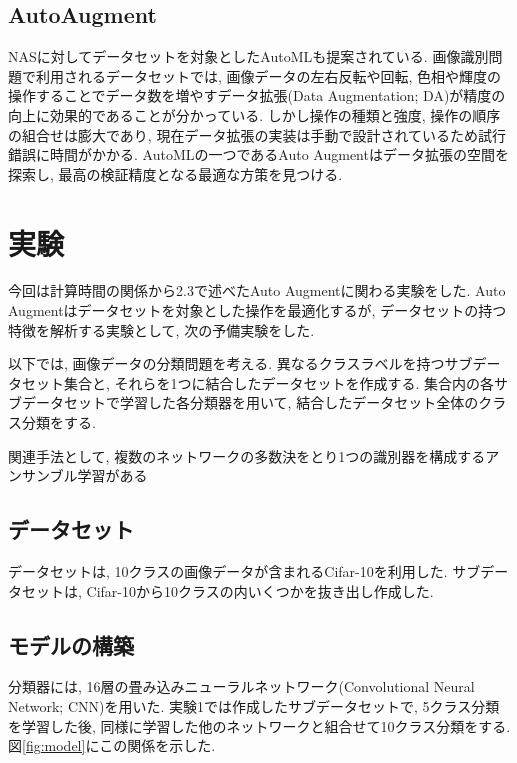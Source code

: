 \documentclass[twocolumn]{jarticle}     %
\begin{document}
\subsection{AutoAugment}

NASに対してデータセットを対象としたAutoMLも提案されている.
画像識別問題で利用されるデータセットでは, 画像データの左右反転や回転, 色相や輝度の操作することでデータ数を増やすデータ拡張(Data Augmentation; DA)が精度の向上に効果的であることが分かっている.
しかし操作の種類と強度, 操作の順序の組合せは膨大であり, 現在データ拡張の実装は手動で設計されているため試行錯誤に時間がかかる.
AutoMLの一つであるAuto Augment\cite{DBLP:journals/corr/abs-1805-09501}はデータ拡張の空間を探索し, 最高の検証精度となる最適な方策を見つける.

\section{実験}
今回は計算時間の関係から2.3で述べたAuto Augmentに関わる実験をした.
Auto Augmentはデータセットを対象とした操作を最適化するが,
データセットの持つ特徴を解析する実験として, 次の予備実験をした.

以下では, 画像データの分類問題を考える.
異なるクラスラベルを持つサブデータセット集合と, それらを1つに結合したデータセットを作成する.
集合内の各サブデータセットで学習した各分類器を用いて, 結合したデータセット全体のクラス分類をする.

関連手法として, 複数のネットワークの多数決をとり1つの識別器を構成するアンサンブル学習がある

\subsection{データセット}
データセットは, 10クラスの画像データが含まれるCifar-10\cite{cifar10}を利用した.
サブデータセットは, Cifar-10から10クラスの内いくつかを抜き出し作成した.

\subsection{モデルの構築}
分類器には, 16層の畳み込みニューラルネットワーク(Convolutional Neural Network; CNN)を用いた.
実験1では作成したサブデータセットで, 5クラス分類を学習した後, 同様に学習した他のネットワークと組合せて10クラス分類をする. 図\ref{fig:model}にこの関係を示した.
\end{document}
